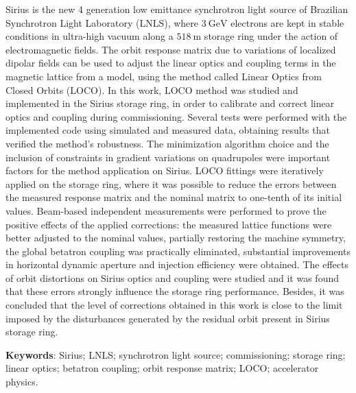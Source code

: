\begin{resumo}
\renewcommand{\sfdefault}{\rmdefault}
    Sirius is the new 4 generation low emittance synchrotron light source of Brazilian Synchrotron Light Laboratory (LNLS), where $\SI{3}{\giga\electronvolt}$ electrons are kept in stable conditions in ultra-high vacuum along a $\SI{518}{\meter}$ storage ring under the action of electromagnetic fields. The orbit response matrix due to variations of localized dipolar fields can be used to adjust the linear optics and coupling terms in the magnetic lattice from a model, using the method called Linear Optics from Closed Orbits (LOCO). In this work, LOCO method was studied and implemented in the Sirius storage ring, in order to calibrate and correct linear optics and coupling during commissioning. Several tests were performed with the implemented code using simulated and measured data, obtaining results that verified the method's robustness. The minimization algorithm choice and the inclusion of constraints in gradient variations on quadrupoles were important factors for the method application on Sirius. LOCO fittings were iteratively applied on the storage ring, where it was possible to reduce the errors between the measured response matrix and the nominal matrix to one-tenth of its initial values. Beam-based independent measurements were performed to prove the positive effects of the applied corrections: the measured lattice functions were better adjusted to the nominal values, partially restoring the machine symmetry, the global betatron coupling was practically eliminated, substantial improvements in horizontal dynamic aperture and injection efficiency were obtained. The effects of orbit distortions on Sirius optics and coupling were studied and it was found that these errors strongly influence the storage ring performance. Besides, it was concluded that the level of corrections obtained in this work is close to the limit imposed by the disturbances generated by the residual orbit present in Sirius storage ring.
    
    \vspace{\onelineskip}
    \noindent\textbf{Keywords}: Sirius; LNLS; synchrotron light source; commissioning; storage ring; linear optics; betatron coupling; orbit response matrix; LOCO; accelerator physics.
    \vspace{\fill}
\end{resumo}

\renewcommand{\sfdefault}{\rmdefault}
\listoffigures*
\cleardoublepage


\renewcommand{\sfdefault}{\rmdefault}
\listoftables*
\cleardoublepage

\renewcommand{\sfdefault}{\rmdefault}
\printglossaries
\cleardoublepage


\renewcommand{\sfdefault}{\rmdefault}
\tableofcontents*
\cleardoublepage
